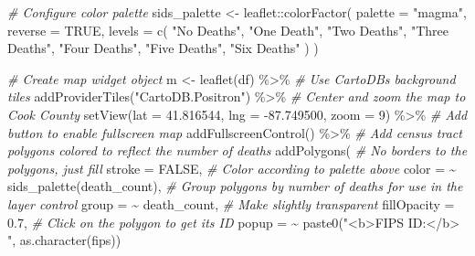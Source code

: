 \documentclass[
]{book}
\newenvironment{Shaded}{\begin{snugshade}}{\end{snugshade}}
\newcommand{\AttributeTok}[1]{\textcolor[rgb]{0.77,0.63,0.00}{#1}}
\newcommand{\CommentTok}[1]{\textcolor[rgb]{0.56,0.35,0.01}{\textit{#1}}}
\newcommand{\ConstantTok}[1]{\textcolor[rgb]{0.00,0.00,0.00}{#1}}
\newcommand{\DecValTok}[1]{\textcolor[rgb]{0.00,0.00,0.81}{#1}}
\newcommand{\FloatTok}[1]{\textcolor[rgb]{0.00,0.00,0.81}{#1}}
\newcommand{\FunctionTok}[1]{\textcolor[rgb]{0.00,0.00,0.00}{#1}}
\newcommand{\NormalTok}[1]{#1}
\newcommand{\OtherTok}[1]{\textcolor[rgb]{0.56,0.35,0.01}{#1}}
\newcommand{\SpecialCharTok}[1]{\textcolor[rgb]{0.00,0.00,0.00}{#1}}
\newcommand{\StringTok}[1]{\textcolor[rgb]{0.31,0.60,0.02}{#1}}
\begin{document}
\begin{Shaded}
\begin{Highlighting}[]
\CommentTok{\# Configure color palette}
\NormalTok{sids\_palette }\OtherTok{\textless{}{-}} 
\NormalTok{    leaflet}\SpecialCharTok{::}\FunctionTok{colorFactor}\NormalTok{(}
        \AttributeTok{palette =} \StringTok{"magma"}\NormalTok{,}
        \AttributeTok{reverse =} \ConstantTok{TRUE}\NormalTok{,}
        \AttributeTok{levels =} \FunctionTok{c}\NormalTok{(}
                \StringTok{"No Deaths"}\NormalTok{, }
                \StringTok{"One Death"}\NormalTok{, }
                \StringTok{"Two Deaths"}\NormalTok{, }
                \StringTok{"Three Deaths"}\NormalTok{, }
                \StringTok{"Four Deaths"}\NormalTok{, }
                \StringTok{"Five Deaths"}\NormalTok{, }
                \StringTok{"Six Deaths"}
\NormalTok{            )}
\NormalTok{    )}

\CommentTok{\# Create map widget object}
\NormalTok{m }\OtherTok{\textless{}{-}} \FunctionTok{leaflet}\NormalTok{(df) }\SpecialCharTok{\%\textgreater{}\%}
    \CommentTok{\# Use CartoDB\textquotesingle{}s background tiles}
    \FunctionTok{addProviderTiles}\NormalTok{(}\StringTok{"CartoDB.Positron"}\NormalTok{) }\SpecialCharTok{\%\textgreater{}\%}
    \CommentTok{\# Center and zoom the map to Cook County}
    \FunctionTok{setView}\NormalTok{(}\AttributeTok{lat =} \FloatTok{41.816544}\NormalTok{, }\AttributeTok{lng =} \SpecialCharTok{{-}}\FloatTok{87.749500}\NormalTok{, }\AttributeTok{zoom =} \DecValTok{9}\NormalTok{) }\SpecialCharTok{\%\textgreater{}\%}
    \CommentTok{\# Add button to enable fullscreen map}
    \FunctionTok{addFullscreenControl}\NormalTok{() }\SpecialCharTok{\%\textgreater{}\%}
    \CommentTok{\# Add census tract polygons colored to reflect the number of deaths}
    \FunctionTok{addPolygons}\NormalTok{(}
        \CommentTok{\# No borders to the polygons, just fill}
        \AttributeTok{stroke =} \ConstantTok{FALSE}\NormalTok{,}
        \CommentTok{\# Color according to palette above}
        \AttributeTok{color =} \SpecialCharTok{\textasciitilde{}} \FunctionTok{sids\_palette}\NormalTok{(death\_count),}
        \CommentTok{\# Group polygons by number of deaths for use in the layer control}
        \AttributeTok{group =} \SpecialCharTok{\textasciitilde{}}\NormalTok{ death\_count,}
        \CommentTok{\# Make slightly transparent}
        \AttributeTok{fillOpacity =} \FloatTok{0.7}\NormalTok{,}
        \CommentTok{\# Click on the polygon to get its ID}
        \AttributeTok{popup =} \SpecialCharTok{\textasciitilde{}} \FunctionTok{paste0}\NormalTok{(}\StringTok{"\textless{}b\textgreater{}FIPS ID:\textless{}/b\textgreater{} "}\NormalTok{, }\FunctionTok{as.character}\NormalTok{(fips))}

\end{Highlighting}
\end{Shaded}
\end{document}
